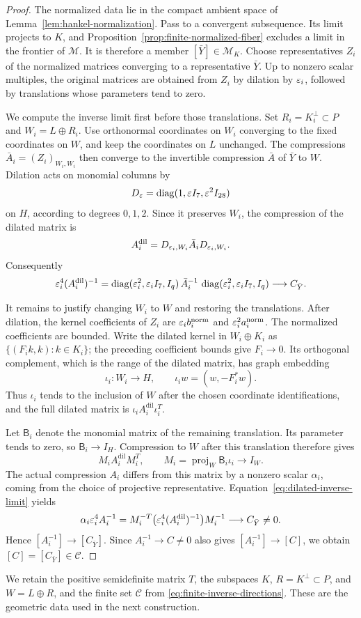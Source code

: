 \begin{proof}
The normalized data lie in the compact ambient space of
Lemma~\ref{lem:hankel-normalization}. Pass to a convergent
subsequence. Its limit projects to $K$, and
Proposition~\ref{prop:finite-normalized-fiber} excludes a limit in
the frontier of $\mathcal M$. It is therefore a member
$[\bar Y]\in\mathcal M_K$. Choose representatives $Z_i$ of the
normalized matrices converging to a representative $\bar Y$.
Up to nonzero scalar multiples, the original matrices are obtained
from $Z_i$ by dilation by $\varepsilon_i$, followed by translations whose
parameters tend to zero.

We compute the inverse limit first before those translations.
Set $R_i=K_i^\perp\subset P$ and $W_i=L\oplus R_i$. Use orthonormal
coordinates on $W_i$ converging to the fixed coordinates on $W$,
and keep the coordinates on $L$ unchanged. The compressions
$\bar A_i=(Z_i)_{W_i,W_i}$ then converge to the invertible
compression $\bar A$ of $\bar Y$ to $W$. Dilation acts on monomial
columns by
\[
 D_{\varepsilon}=\operatorname{diag}(1,\varepsilon I_7,\varepsilon^2 I_{28})
\]
on $H$, according to degrees $0,1,2$. Since it preserves $W_i$,
the compression of the dilated matrix is
\[
 A_i^{\mathrm{dil}}
   =D_{\varepsilon_i,W_i}\bar A_iD_{\varepsilon_i,W_i}.
\]
Consequently
\begin{equation}
\label{eq:dilated-inverse-limit}
 \varepsilon_i^4(A_i^{\mathrm{dil}})^{-1}
 =\operatorname{diag}(\varepsilon_i^2,\varepsilon_i I_7,I_q)\,
   \bar A_i^{-1}\,
   \operatorname{diag}(\varepsilon_i^2,\varepsilon_i I_7,I_q)
 \longrightarrow C_{\bar Y}.
\end{equation}

It remains to justify changing $W_i$ to $W$ and restoring the
translations. After dilation, the kernel coefficients of $Z_i$
are $\varepsilon_i b_i^{\mathrm{norm}}$ and
$\varepsilon_i^2 a_i^{\mathrm{norm}}$. The normalized coefficients are
bounded. Write the dilated kernel in $W_i\oplus K_i$ as
$\{(F_i k,k):k\in K_i\}$; the preceding coefficient bounds give
$F_i\to0$. Its orthogonal complement, which is the range of the
dilated matrix, has graph embedding
\[
 \iota_i:W_i\longrightarrow H,\qquad
 \iota_i w=(w,-F_i^*w).
\]
Thus $\iota_i$ tends to the inclusion of $W$ after the chosen
coordinate identifications, and the full dilated matrix is
$\iota_iA_i^{\mathrm{dil}}\iota_i^T$.

Let $\mathsf B_i$ denote the monomial matrix of the remaining translation.
Its parameter tends to zero, so $\mathsf B_i\to I_H$. Compression to $W$
after this translation therefore gives
\[
 M_iA_i^{\mathrm{dil}}M_i^T,
 \qquad M_i=\operatorname{proj}_W\mathsf B_i\iota_i\longrightarrow I_W.
\]
The actual compression $A_i$ differs from this matrix by a nonzero
scalar $\alpha_i$, coming from the choice of projective
representative. Equation~\eqref{eq:dilated-inverse-limit} yields
\[
 \alpha_i\varepsilon_i^4 A_i^{-1}
   =M_i^{-T}\bigl(\varepsilon_i^4(A_i^{\mathrm{dil}})^{-1}\bigr)M_i^{-1}
   \longrightarrow C_{\bar Y}\ne0.
\]
Hence $[A_i^{-1}]\to[C_{\bar Y}]$. Since $A_i^{-1}\to C\ne0$
also gives $[A_i^{-1}]\to[C]$, we obtain
$[C]=[C_{\bar Y}]\in\mathcal C$.
\end{proof}

We retain the positive semidefinite matrix $T$, the subspaces
$K$, $R=K^\perp\subset P$, and $W=L\oplus R$, and the finite set
$\mathcal C$ from \eqref{eq:finite-inverse-directions}. These are the
geometric data used in the next construction.
